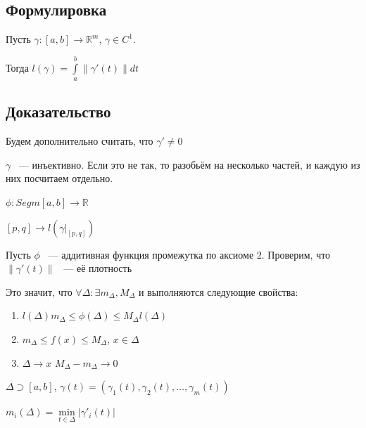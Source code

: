 \documentclass{article}
\begin{document}
        \subsection{Формулировка}
        
            Пусть $\gamma : [a, b] \rightarrow \mathbb{R}^m$, $\gamma \in C^1$.
            
            Тогда $l(\gamma) = \int\limits^b_a \| \gamma'(t) \| dt$
            
        \subsection{Доказательство}
        
            Будем дополнительно считать, что $\gamma' \neq 0$
            
            $\gamma$ ~--- инъективно. Если это не так, то разобьём на несколько частей, и каждую из них посчитаем отдельно.
            
            $\phi : Segm[a, b] \rightarrow \mathbb{R}$
            
            $[p, q] \rightarrow l\left(\gamma|_{[p, q]} \right)$
            
            Пусть $\phi$ ~--- аддитивная функция промежутка по аксиоме 2. Проверим, что $\| \gamma'(t) \|$ ~--- её плотность
            
            Это значит, что $\forall \Delta : \exists m_{\Delta}, M_{\Delta}$ и выполняются следующие свойства:
            
            \begin{enumerate}
            
                \item $l(\Delta) m_{\Delta} \leq \phi(\Delta) \leq M_{\Delta} l(\Delta)$
                
                \item $m_{\Delta} \leq f(x) \leq M_{\Delta}$, $x \in \Delta$
                
                \item $\Delta \rightarrow x$ $M_{\Delta} - m_{\Delta} \rightarrow 0$
                
            \end{enumerate}
            
            $\Delta \supset [a, b]$, $\gamma(t) = (\gamma_1(t), \gamma_2(t), \ldots, \gamma_m(t))$
            
            $m_i(\Delta) = \min\limits_{t \in \Delta} | \gamma'_i(t) |$
            
\end{document}

